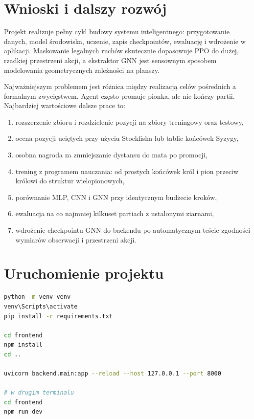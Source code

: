 \documentclass[12pt,a4paper]{article}
\begin{document}
\section{Wnioski i dalszy rozwój}

Projekt realizuje pełny cykl budowy systemu inteligentnego: przygotowanie danych,
model środowiska, uczenie, zapis checkpointów, ewaluację i wdrożenie w aplikacji.
Maskowanie legalnych ruchów skutecznie dopasowuje PPO do dużej, rzadkiej
przestrzeni akcji, a ekstraktor GNN jest sensownym sposobem modelowania
geometrycznych zależności na planszy.

Najważniejszym problemem jest różnica między realizacją celów pośrednich a
formalnym zwycięstwem. Agent często promuje pionka, ale nie kończy partii.
Najbardziej wartościowe dalsze prace to:

\begin{enumerate}[leftmargin=*]
    \item rozszerzenie zbioru i rozdzielenie pozycji na zbiory treningowy oraz testowy,
    \item ocena pozycji uciętych przy użyciu Stockfisha lub tablic końcówek Syzygy,
    \item osobna nagroda za zmniejszanie dystansu do mata po promocji,
    \item trening z programem nauczania: od prostych końcówek król i pion przeciw
    królowi do struktur wielopionowych,
    \item porównanie MLP, CNN i GNN przy identycznym budżecie kroków,
    \item ewaluacja na co najmniej kilkuset partiach z ustalonymi ziarnami,
    \item wdrożenie checkpointu GNN do backendu po automatycznym teście zgodności
    wymiarów obserwacji i przestrzeni akcji.
\end{enumerate}

\section{Uruchomienie projektu}

\begin{lstlisting}[language=bash,caption={Instalacja i uruchomienie aplikacji.}]
python -m venv venv
venv\Scripts\activate
pip install -r requirements.txt

cd frontend
npm install
cd ..

uvicorn backend.main:app --reload --host 127.0.0.1 --port 8000

# w drugim terminalu
cd frontend
npm run dev
\end{lstlisting}
\end{document}
